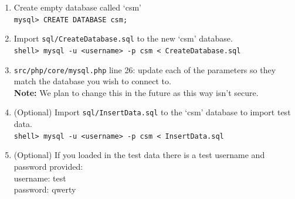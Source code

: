 \documentclass[11pt, a4paper]{article}
\begin{document}
\begin{enumerate}
\item Create empty database called ‘csm’\\
\texttt{mysql> CREATE DATABASE csm;}

\item Import \texttt{sql/CreateDatabase.sql} to the new ‘csm’ database.\\
\texttt{shell> mysql -u <username> -p csm < CreateDatabase.sql}

\item \texttt{src/php/core/mysql.php} line 26: update each of the parameters so they match the database you wish to connect to.\\
 \textbf{Note:} We plan to change this in the future as this way isn’t secure.
 
 \item 	(Optional) Import \texttt{sql/InsertData.sql} to the ‘csm’ database to import test data.\\
 \texttt{shell> mysql -u <username> -p csm < InsertData.sql}
 
 \item (Optional) If you loaded in the test data there is a test username and password provided:\\
username: test\\
 password: qwerty
\end{enumerate}
\end{document}
